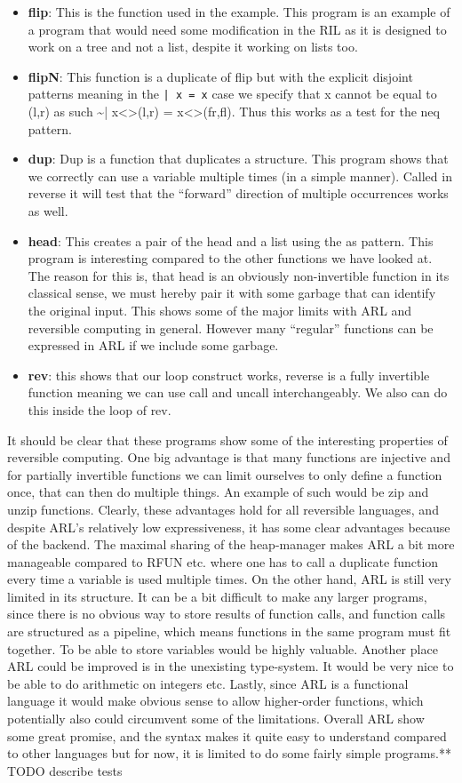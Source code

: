 \documentclass[a4paper]{article}
\begin{document}
\begin{itemize}
\item \textbf{flip}: This is the function used in the example. This program is an example of a program that would need some modification in the RIL as it is designed to work on a tree and not a list, despite it working on lists too.
\item \textbf{flipN}: This function is a duplicate of flip but with the explicit disjoint patterns meaning in the \texttt{| x = x} case we specify that x cannot be equal to (l,r) as such \textasciitilde{}| x<>(l,r) = x<>(fr,fl). Thus this works as a test for the neq pattern.
\item \textbf{dup}: Dup is a function that duplicates a structure. This program shows that we correctly can use a variable multiple times (in a simple manner). Called in reverse it will test that the ``forward'' direction of multiple occurrences works as well.
\item \textbf{head}: This creates a pair of the head and a list using the as pattern. This program is interesting compared to the other functions we have looked at. The reason for this is, that head is an obviously non-invertible function in its classical sense, we must hereby pair it with some garbage that can identify the original input. This shows some of the major limits with ARL and reversible computing in general. However many ``regular'' functions can be expressed in ARL if we include some garbage.
\item \textbf{rev}: this shows that our loop construct works, reverse is a fully invertible function meaning we can use call and uncall interchangeably. We also can do this inside the loop of rev.
\end{itemize}
It should be clear that these programs show some of the interesting properties of reversible computing. One big advantage is that many functions are injective and for partially invertible functions we can limit ourselves to only define a function once, that can then do multiple things. An example of such would be zip and unzip functions. Clearly, these advantages hold for all reversible languages, and despite ARL's relatively low expressiveness, it has some clear advantages because of the backend. The maximal sharing of the heap-manager makes ARL a bit more manageable compared to RFUN etc. where one has to call a duplicate function every time a variable is used multiple times. On the other hand, ARL is still very limited in its structure. It can be a bit difficult to make any larger programs, since there is no obvious way to store results of function calls, and function calls are structured as a pipeline, which means functions in the same program must fit together. To be able to store variables would be highly valuable. Another place ARL could be improved is in the unexisting type-system. It would be very nice to be able to do arithmetic on integers etc. Lastly, since ARL is a functional language it would make obvious sense to allow higher-order functions, which potentially also could circumvent some of the limitations. Overall ARL show some great promise, and the syntax makes it quite easy to understand compared to other languages but for now, it is limited to do some fairly simple programs.** TODO describe tests
\end{document}

